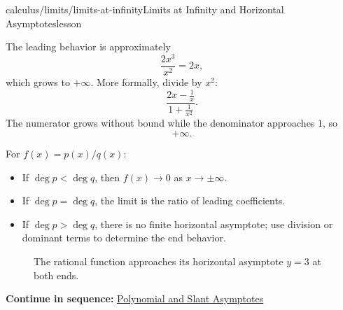 \documentclass[11pt,openany]{book}
\theoremstyle{bgplain}
\newcounter{bgexample}[chapter]
\newcommand{\webnext}[2]{%
  \par\addvspace{1.2em}\noindent{\color{BGLine}\rule{\textwidth}{0.35pt}}\par\smallskip
  {\small\color{BGGray}\textbf{Continue in sequence:} \hyperlink{web:#1}{#2}}\par
}
\begin{document}
\begin{webpage}{calculus/limits/limits-at-infinity}{Limits at Infinity and Horizontal Asymptotes}{lesson}
\begin{bgexample}[title={Unbounded end behavior}]
\begin{bgsolution}
The leading behavior is approximately
\[
  \frac{2x^3}{x^2}=2x,
\]
which grows to \(+\infty\). More formally, divide by \(x^2\):
\[
  \frac{2x-\frac1x}{1+\frac1{x^2}}.
\]
The numerator grows without bound while the denominator approaches \(1\), so
\[
  \boxed{+\infty}.
\]
\end{bgsolution}
\end{bgexample}

\begin{bgtheorem}[title={Rational-Function Degree Rules}]
For \(f(x)=p(x)/q(x)\):
\begin{itemize}
  \item If \(\deg p<\deg q\), then \(f(x)\to0\) as \(x\to\pm\infty\).
  \item If \(\deg p=\deg q\), the limit is the ratio of leading coefficients.
  \item If \(\deg p>\deg q\), there is no finite horizontal asymptote; use division or dominant terms to determine the end behavior.
\end{itemize}
\end{bgtheorem}

\begin{figure}[htbp]
\centering
{}
\caption{The rational function approaches its horizontal asymptote \(y=3\) at both ends.}
\label{fig:horizontal-asymptote}
\end{figure}
\webnext{calculus/limits/slant-asymptotes}{Polynomial and Slant Asymptotes}
\end{webpage}
\end{document}
